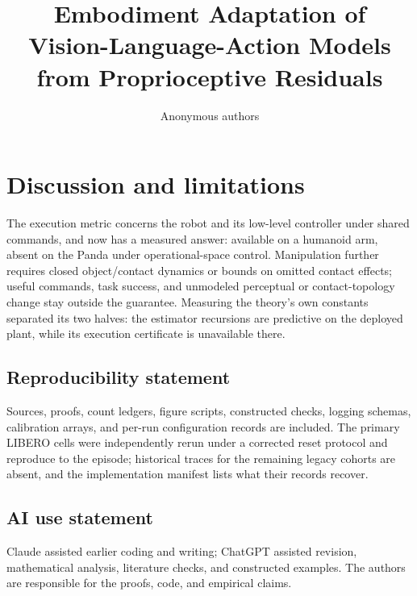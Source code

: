 \documentclass{article}
\title{Embodiment Adaptation of\\Vision-Language-Action Models\\from Proprioceptive Residuals}
\author{Anonymous authors}
\begin{document}
\maketitle






\section{Discussion and limitations}
The execution metric concerns the robot and its low-level controller under
shared commands, and now has a measured answer: available on a humanoid arm,
absent on the Panda under operational-space control. Manipulation further
requires closed object/contact dynamics or bounds on omitted contact effects;
useful commands, task success, and unmodeled perceptual or contact-topology
change stay outside the guarantee. Measuring the theory's own constants
separated its two halves: the estimator recursions are predictive on the
deployed plant, while its execution certificate is unavailable there.\label{maintext:end}

\clearpage
\subsection*{Reproducibility statement}
Sources, proofs, count ledgers, figure scripts, constructed checks,
logging schemas, calibration arrays, and per-run configuration records are
included. The primary LIBERO cells were independently rerun under a
corrected reset protocol and reproduce to the episode; historical traces for
the remaining legacy cohorts are absent, and the implementation manifest
lists what their records recover.

\subsection*{AI use statement}
Claude assisted earlier coding and writing; ChatGPT assisted revision,
mathematical analysis, literature checks, and constructed examples. The
authors are responsible for the proofs, code, and empirical claims.


\clearpage
\appendix
\raggedbottom







\end{document}
